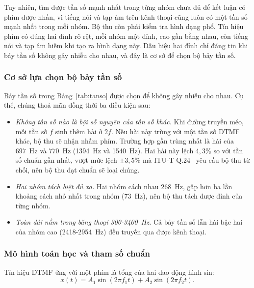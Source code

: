 \documentclass{dtmf_report}
\begin{document}
Tuy nhiên, tìm được tần số mạnh nhất trong từng nhóm chưa đủ để kết luận có phím
được nhấn, vì tiếng nói và tạp âm trên kênh thoại cũng luôn có một tần số mạnh
nhất trong mỗi nhóm. Bộ thu còn phải kiểm tra hình dạng phổ. Tín hiệu phím có đúng
hai đỉnh rõ rệt, mỗi nhóm một đỉnh, cao gần bằng nhau, còn tiếng nói và tạp âm
hiếm khi tạo ra hình dạng này. Dấu hiệu hai đỉnh chỉ đáng tin khi bảy tần số không
gây nhiễu cho nhau, và đây là cơ sở để chọn bộ bảy tần số.

\subsubsection{Cơ sở lựa chọn bộ bảy tần số}
\label{sss:chon-tan-so}

Bảy tần số trong Bảng~\ref{tab:tanso} được chọn để không gây nhiễu cho nhau. Cụ
thể, chúng thoả mãn đồng thời ba điều kiện sau:

\begin{itemize}
    \item \emph{Không tần số nào là bội số nguyên của tần số khác.} Khi đường
    truyền méo, mỗi tần số $f$ sinh thêm hài ở $2f$. Nếu hài này trùng với một
    tần số DTMF khác, bộ thu sẽ nhận nhầm phím. Trường hợp gần trùng nhất là hài của
    697~Hz và 770~Hz (1394~Hz và 1540~Hz). Hai hài này lệch $4{,}3\%$ so
    với tần số chuẩn gần nhất, vượt mức lệch $\pm 3{,}5\%$ mà \mbox{ITU-T}
    Q.24~\cite{itu_q24} yêu cầu bộ thu từ chối, nên bộ thu đạt chuẩn sẽ
    loại chúng.

    \item \emph{Hai nhóm tách biệt đủ xa.} Hai nhóm cách nhau 268~Hz, gấp hơn
    ba lần khoảng cách nhỏ nhất trong nhóm (73~Hz), nên bộ thu tách được đỉnh
    của từng nhóm.

    \item \emph{Toàn dải nằm trong băng thoại 300-3400~Hz.} Cả bảy tần số lẫn
    hài bậc hai của nhóm cao (2418-2954~Hz) đều truyền qua được kênh thoại.
\end{itemize}

\subsubsection{Mô hình toán học và tham số chuẩn}

Tín hiệu DTMF ứng với một phím là tổng của hai dao động hình sin:
\begin{equation}\label{eq:dtmf-lien-tuc}
  x(t) = A_{1}\sin(2\pi f_{1} t) + A_{2}\sin(2\pi f_{2} t).
\end{equation}
\end{document}

